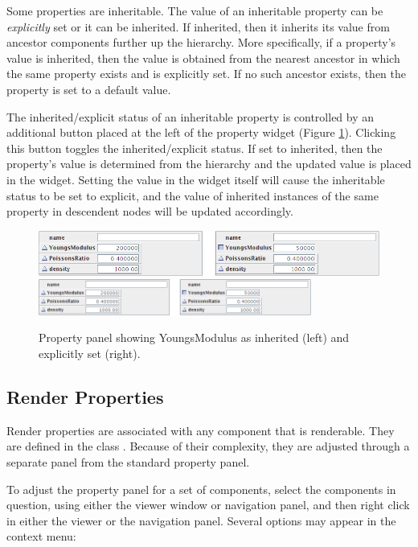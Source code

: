 \documentclass{article}
\begin{document}
Some properties are inheritable. The value of an inheritable property
can be {\it explicitly} set or it can be inherited.  If inherited, then it
inherits its value from ancestor components further up the hierarchy.
More specifically, if a property's value is inherited, then the value
is obtained from the nearest ancestor in which the same property
exists and is explicitly set.  If no such ancestor exists, then the
property is set to a default value.

The inherited/explicit status of an inheritable property is controlled
by an additional button placed at the left of the property widget
(Figure \ref{inheritedButtonFig}).  Clicking this button toggles the
inherited/explicit status.  If set to inherited, then the property's
value is determined from the hierarchy and the updated value is placed
in the widget.  Setting the value in the widget itself will cause the
inheritable status to be set to explicit, and the value of inherited
instances of the same property in descendent nodes will be updated
accordingly.

\begin{figure}
\begin{center}
\iflatexml
\includegraphics[]{images/inheritedButton}
\else
\includegraphics[width=0.80\textwidth]{images/inheritedButton}
\fi
\end{center}
\caption{Property panel showing YoungsModulus as inherited (left) and 
explicitly set (right).}%
\label{inheritedButtonFig}
\end{figure}

\subsection{Render Properties}

Render properties are associated with any component that is
renderable. They are defined in the class 
. 
Because of their complexity, they are adjusted
through a separate panel from the standard property panel.

To adjust the property panel for a set of components, select the components
in question, using either the viewer window or navigation panel, and then right 
click in either the viewer or the navigation panel. Several options may appear
in the context menu:
\end{document}
